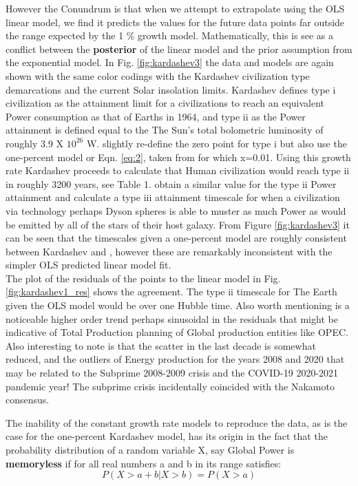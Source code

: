 \documentclass[final,5p,times,twocolumn,authoryear]{elsarticle}
\begin{document}
However the Conundrum is that when we attempt to extrapolate using the OLS linear model, we find it predicts the values for the future data points far outside the range expected by the 1 \% growth model. Mathematically, this is see as a conflict between the \textbf{posterior} of the linear model and the prior assumption from the exponential model. 
In Fig. \ref{fig:kardashev3} the data and models are again shown with the same color codings with the Kardashev civilization type demarcations and the current Solar insolation limits. Kardashev defines type i civilization as the attainment limit for a civilizations to reach an equivalent Power consumption as that of Earths in 1964, and type ii as the Power attainment is defined equal to the The Sun's total bolometric luminosity of roughly 3.9 X $10^{26}$ W. \cite{sagan73} slightly re-define the zero point for type i but \cite{sagan73} also use the one-percent model or Eqn. \ref{eq:2}, taken from \cite{kar64} for which x=0.01. Using  this growth rate Kardashev proceeds to calculate that Human civilization would reach type ii in roughly 3200 years, see Table 1. \cite{sagan73} obtain a similar value for the type ii Power attainment and calculate a type iii attainment timescale for when a civilization via technology perhaps Dyson spheres is able to muster as much Power as would be emitted by all of the stars of their host galaxy. From Figure \ref{fig:kardashev3} it can be seen that the timescales given a one-percent model are roughly consistent between Kardashev and \cite{sagan73}, however these are remarkably inconsistent with the simpler OLS predicted linear model fit. \\  
The plot of the residuals of the points to the linear model in Fig. \ref{fig:kardashev1_res} shows the agreement. 
The type ii timescale for The Earth given the OLS model would be over one Hubble time. Also worth mentioning is a noticeable higher order trend perhaps sinusoidal in the residuals that might be indicative of Total Production planning of Global production entities like OPEC. Also interesting to note is that the scatter in the last decade is somewhat reduced, and the outliers of Energy production for the years 2008 and 2020 that may be related to the Subprime 2008-2009 crisis and the COVID-19 2020-2021 pandemic year! The subprime crisis incidentally coincided with the Nakamoto consensus. 

The inability of the constant growth rate models to reproduce the data, as is the case for the one-percent Kardashev model, has its origin in the fact that the probability distribution of a random variable X, say Global Power is \textbf{memoryless} if for all real numbers a and b in its range satisfies:
\begin{equation}
P(X>a +b|X>b)=P(X>a)
\label{eqn:memless}
\end{equation}
\end{document}
